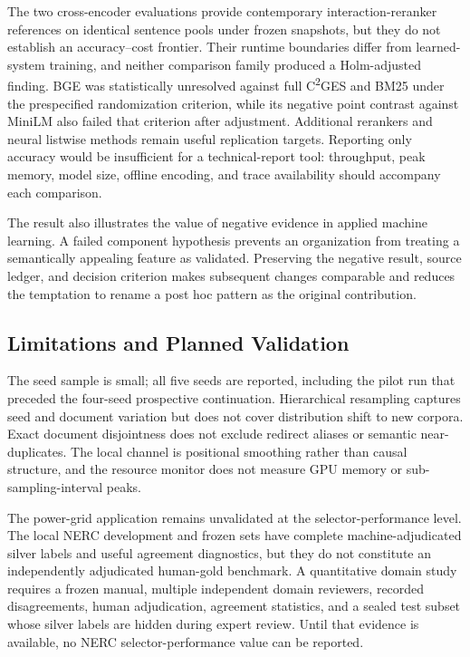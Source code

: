 \documentclass[applsci,article,submit,moreauthors]{Definitions/mdpi}
\newcommand{\cges}{C\textsuperscript{2}GES}
\begin{document}
The two cross-encoder evaluations provide contemporary interaction-reranker references on identical sentence pools under frozen snapshots, but they do not establish an accuracy--cost frontier. Their runtime boundaries differ from learned-system training, and neither comparison family produced a Holm-adjusted finding. BGE was statistically unresolved against full \cges{} and BM25 under the prespecified randomization criterion, while its negative point contrast against MiniLM also failed that criterion after adjustment. Additional rerankers and neural listwise methods remain useful replication targets. Reporting only accuracy would be insufficient for a technical-report tool: throughput, peak memory, model size, offline encoding, and trace availability should accompany each comparison.

The result also illustrates the value of negative evidence in applied machine learning. A failed component hypothesis prevents an organization from treating a semantically appealing feature as validated. Preserving the negative result, source ledger, and decision criterion makes subsequent changes comparable and reduces the temptation to rename a post hoc pattern as the original contribution.

\subsection{Limitations and Planned Validation}
The seed sample is small; all five seeds are reported, including the pilot run that preceded the four-seed prospective continuation. Hierarchical resampling captures seed and document variation but does not cover distribution shift to new corpora. Exact document disjointness does not exclude redirect aliases or semantic near-duplicates. The local channel is positional smoothing rather than causal structure, and the resource monitor does not measure GPU memory or sub-sampling-interval peaks.

The power-grid application remains unvalidated at the selector-performance level. The local NERC development and frozen sets have complete machine-adjudicated silver labels and useful agreement diagnostics, but they do not constitute an independently adjudicated human-gold benchmark. A quantitative domain study requires a frozen manual, multiple independent domain reviewers, recorded disagreements, human adjudication, agreement statistics, and a sealed test subset whose silver labels are hidden during expert review. Until that evidence is available, no NERC selector-performance value can be reported.
\end{document}
